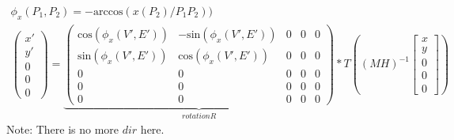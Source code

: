 \documentclass{report}
\begin{document}
\begin{align}
\phi_{x}(P_{1},P_{2}) = -\mathrm{arccos}(x(P_{2})/P_{1}P_{2}))\\
\begin{pmatrix}x' \\ y' \\ 0 \\ 0 \\ 0\end{pmatrix}=
\underbrace{
\begin{pmatrix}
\mathrm{cos}(\phi_{x}(V',E')) & -\mathrm{sin}(\phi_{x}(V',E')) & 0 & 0 & 0 \\
\mathrm{sin}(\phi_{x}(V',E')) & \mathrm{cos}(\phi_{x}(V',E')) & 0 & 0 & 0 \\
0 & 0 & 0 & 0 & 0 \\
0 & 0 & 0 & 0 & 0 \\
0 & 0 & 0 & 0 & 0
\end{pmatrix}
}_{rotation R}*
T((MH)^{-1}\begin{bmatrix} x \\ y \\ 0 \\ 0 \\ 0 \end{bmatrix})
\end{align}
Note: There is no more $dir$ here.
\end{document}
